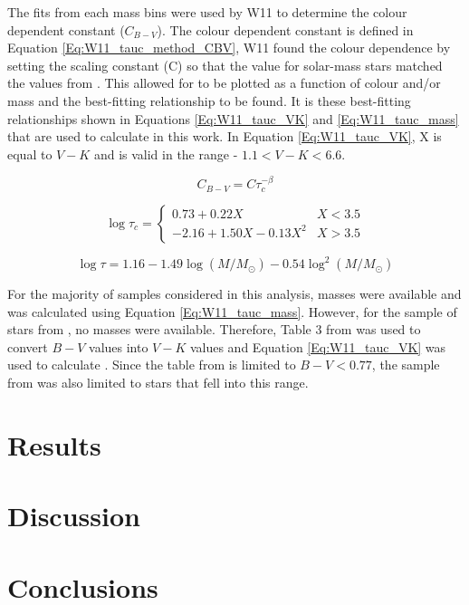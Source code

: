 The fits from each mass bins were used by W11 to determine the colour dependent constant ($C_{B-V}$). The colour dependent constant is defined in Equation \ref{Eq:W11_tauc_method_CBV}, W11 found the colour dependence by setting the scaling constant (C) so that the \tauc value for solar-mass stars matched the values from \citet{Noyes_etal_1984}. This allowed for \tauc to be plotted as a function of colour and/or mass and the best-fitting relationship to be found. It is these best-fitting relationships shown in Equations \ref{Eq:W11_tauc_VK} and \ref{Eq:W11_tauc_mass} that are used to calculate \tauc in this work. In Equation \ref{Eq:W11_tauc_VK}, X is equal to $V-K$ and is valid in the range - $1.1 < V-K < 6.6$.

\begin{equation}
    C_{B-V} = C\tau_{c}^{-\beta}
    \label{Eq:W11_tauc_method_CBV}
\end{equation}

\begin{equation}
    \log \tau_{c} = 
    \begin{cases}
        0.73 + 0.22X & X < 3.5 \\
        -2.16 +1.50X - 0.13X^{2} & X > 3.5
    \end{cases}
    \label{Eq:W11_tauc_VK}
\end{equation}

\begin{equation}
    \log \tau = 1.16 - 1.49\log(M/M_{\odot}) - 0.54\log^{2}(M/M_{\odot})
    \label{Eq:W11_tauc_mass}
\end{equation}

For the majority of samples considered in this analysis, masses were available and \tauc was calculated using Equation \ref{Eq:W11_tauc_mass}. However, for the sample of stars from \citet{Baliunas_etal_1996}, no masses were available. Therefore, Table 3 from \citet{Pecaut_etal_2012} was used to convert $B-V$ values into $V-K$ values and Equation \ref{Eq:W11_tauc_VK} was used to calculate \tauc. Since the table from \citet{Pecaut_etal_2012} is limited to $B-V < 0.77$, the sample from \citet{Baliunas_etal_1996} was also limited to stars that fell into this range.

\section{Results}


\section{Discussion}


\section{Conclusions}


























